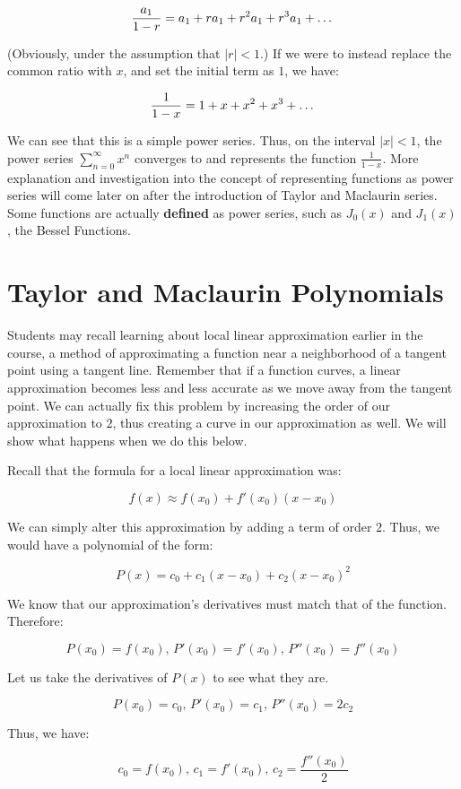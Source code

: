 \documentclass[11pt]{article}
\begin{document}
\[\frac{a_1}{1-r} = a_1 + ra_1 + r^2a_1 + r^3a_1 + \text{\dots}\]

(Obviously, under the assumption that $|r|<1$.) If we were to instead replace the common ratio with $x$, and set the initial term as $1$, we have:

\[\frac{1}{1-x} = 1 + x + x^2 + x^3 + \text{\dots}\]

We can see that this is a simple power series. Thus, on the interval $|x|<1$, the power series $\sum_{n=0}^{\infty}x^n$ converges to and represents the function $\frac{1}{1-x}$. More explanation and investigation into the concept of representing functions as power series will come later on after the introduction of Taylor and Maclaurin series. Some functions are actually \textbf{defined} as power series, such as $J_0(x)$ and $J_1(x)$, the Bessel Functions. 

\section{Taylor and Maclaurin Polynomials}
Students may recall learning about local linear approximation earlier in the course, a method of approximating a function near a neighborhood of a tangent point using a tangent line. Remember that if a function curves, a linear approximation becomes less and less accurate as we move away from the tangent point. We can actually fix this problem by increasing the order of our approximation to $2$, thus creating a curve in our approximation as well. We will show what happens when we do this below.

Recall that the formula for a local linear approximation was:

\[f(x) \approx f(x_0)+f'(x_0)(x-x_0)\]

We can simply alter this approximation by adding a term of order $2$. Thus, we would have a polynomial of the form:

\[P(x) = c_0+c_1(x-x_0)+c_2(x-x_0)^2\]

We know that our approximation's derivatives must match that of the function. Therefore:

\[P(x_0)=f(x_0)\text{, }P'(x_0)=f'(x_0)\text{, }P''(x_0)=f''(x_0)\]

Let us take the derivatives of $P(x)$ to see what they are.

\[P(x_0)=c_0\text{, }P'(x_0)=c_1\text{, }P''(x_0)=2c_2\]

Thus, we have:

\[c_0=f(x_0)\text{, }c_1=f'(x_0)\text{, }c_2=\frac{f''(x_0)}{2}\]
\end{document}
